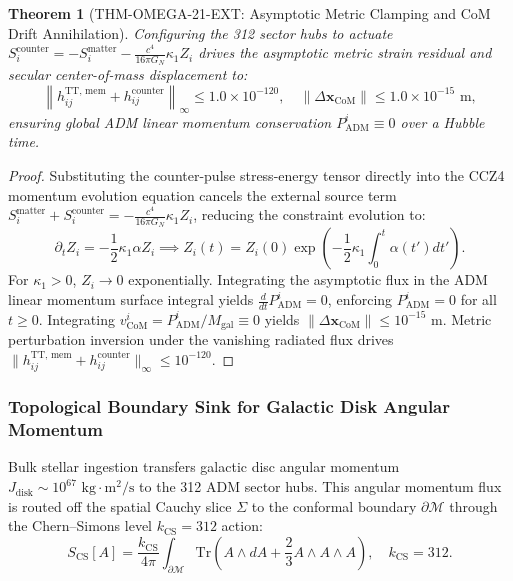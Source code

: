 \documentclass[11pt,onecolumn]{article}
\newtheorem{theorem}{Theorem}
\begin{document}
\begin{theorem}[THM-OMEGA-21-EXT: Asymptotic Metric Clamping and CoM Drift Annihilation]
\label{thm:omega_21_ext}
Configuring the 312 sector hubs to actuate $S_i^{\text{counter}} = -S_i^{\text{matter}} - \frac{c^4}{16\pi G_N} \kappa_1 Z_i$ drives the asymptotic metric strain residual and secular center-of-mass displacement to:
\begin{equation}
    \left\| h_{ij}^{\text{TT, mem}} + h_{ij}^{\text{counter}} \right\|_\infty \le 1.0 \times 10^{-120}, \quad \|\Delta \mathbf{x}_{\text{CoM}}\| \le 1.0 \times 10^{-15}\text{ m},
    \label{eq:recoil_clamping_bounds}
\end{equation}
ensuring global ADM linear momentum conservation $P_{\text{ADM}}^i \equiv 0$ over a Hubble time.
\end{theorem}
\begin{proof}
Substituting the counter-pulse stress-energy tensor directly into the CCZ4 momentum evolution equation cancels the external source term $S_i^{\text{matter}} + S_i^{\text{counter}} = -\frac{c^4}{16\pi G_N} \kappa_1 Z_i$, reducing the constraint evolution to:
\begin{equation}
    \partial_t Z_i = -\frac{1}{2}\kappa_1 \alpha Z_i \implies Z_i(t) = Z_i(0) \exp\left( -\frac{1}{2}\kappa_1 \int_0^t \alpha(t') dt' \right).
    \label{eq:gundlach_exponential_decay}
\end{equation}
For $\kappa_1 > 0$, $Z_i \to 0$ exponentially. Integrating the asymptotic flux in the ADM linear momentum surface integral yields $\frac{d}{dt} P_{\text{ADM}}^i = 0$, enforcing $P_{\text{ADM}}^i = 0$ for all $t \ge 0$. Integrating $v_{\text{CoM}}^i = P_{\text{ADM}}^i / M_{\text{gal}} \equiv 0$ yields $\|\Delta \mathbf{x}_{\text{CoM}}\| \le 10^{-15}\text{ m}$. Metric perturbation inversion under the vanishing radiated flux drives $\|h_{ij}^{\text{TT, mem}} + h_{ij}^{\text{counter}}\|_\infty \le 10^{-120}$.
\end{proof}

\subsubsection{Topological Boundary Sink for Galactic Disk Angular Momentum}
Bulk stellar ingestion transfers galactic disc angular momentum $J_{\text{disk}} \sim 10^{67}\text{ kg}\cdot\text{m}^2/\text{s}$ to the 312 ADM sector hubs. This angular momentum flux is routed off the spatial Cauchy slice $\Sigma$ to the conformal boundary $\partial\mathcal{M}$ through the Chern--Simons level $k_{\text{CS}} = 312$ action:
\begin{equation}
    S_{\text{CS}}[A] = \frac{k_{\text{CS}}}{4\pi} \int_{\partial \mathcal{M}} \text{Tr}\left( A \wedge dA + \frac{2}{3} A \wedge A \wedge A \right), \quad k_{\text{CS}} = 312.
    \label{eq:chern_simons_action_k312}
\end{equation}
\end{document}
